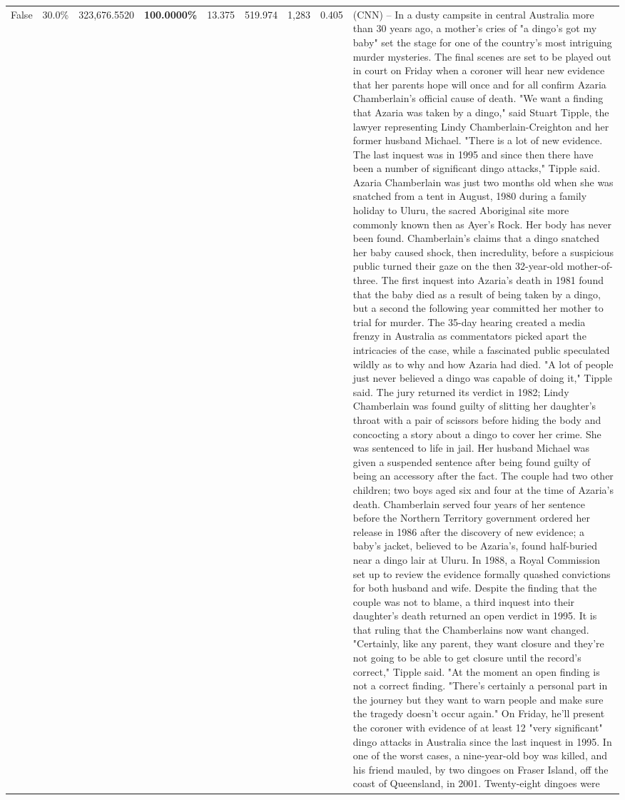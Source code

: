 \begin{table}[H]
\begin{tabular}{lllrlllll}
False & 30.0\% & 323,676.5520 & \bfseries \color{red} 100.0000\% & 13.375 & 519.974 & 1,283 & 0.405 & (CNN) -- In a dusty campsite in central Australia more than 30 years ago, a mother's cries of "a dingo's got my baby" set the stage for one of the country's most intriguing murder mysteries. The final scenes are set to be played out in court on Friday when a coroner will hear new evidence that her parents hope will once and for all confirm Azaria Chamberlain's official cause of death. "We want a finding that Azaria was taken by a dingo," said Stuart Tipple, the lawyer representing Lindy Chamberlain-Creighton and her former husband Michael. "There is a lot of new evidence. The last inquest was in 1995 and since then there have been a number of significant dingo attacks," Tipple said. Azaria Chamberlain was just two months old when she was snatched from a tent in August, 1980 during a family holiday to Uluru, the sacred Aboriginal site more commonly known then as Ayer's Rock. Her body has never been found. Chamberlain's claims that a dingo snatched her baby caused shock, then incredulity, before a suspicious public turned their gaze on the then 32-year-old mother-of-three. The first inquest into Azaria's death in 1981 found that the baby died as a result of being taken by a dingo, but a second the following year committed her mother to trial for murder. The 35-day hearing created a media frenzy in Australia as commentators picked apart the intricacies of the case, while a fascinated public speculated wildly as to why and how Azaria had died. "A lot of people just never believed a dingo was capable of doing it," Tipple said. The jury returned its verdict in 1982; Lindy Chamberlain was found guilty of slitting her daughter's throat with a pair of scissors before hiding the body and concocting a story about a dingo to cover her crime. She was sentenced to life in jail. Her husband Michael was given a suspended sentence after being found guilty of being an accessory after the fact. The couple had two other children; two boys aged six and four at the time of Azaria's death. Chamberlain served four years of her sentence before the Northern Territory government ordered her release in 1986 after the discovery of new evidence; a baby's jacket, believed to be Azaria's, found half-buried near a dingo lair at Uluru. In 1988, a Royal Commission set up to review the evidence formally quashed convictions for both husband and wife. Despite the finding that the couple was not to blame, a third inquest into their daughter's death returned an open verdict in 1995. It is that ruling that the Chamberlains now want changed. "Certainly, like any parent, they want closure and they're not going to be able to get closure until the record's correct," Tipple said. "At the moment an open finding is not a correct finding. "There's certainly a personal part in the journey but they want to warn people and make sure the tragedy doesn't occur again." On Friday, he'll present the coroner with evidence of at least 12 "very significant" dingo attacks in Australia since the last inquest in 1995. In one of the worst cases, a nine-year-old boy was killed, and his friend mauled, by two dingoes on Fraser Island, off the coast of Queensland, in 2001. Twenty-eight dingoes were 
\end{tabular}
\end{table}
